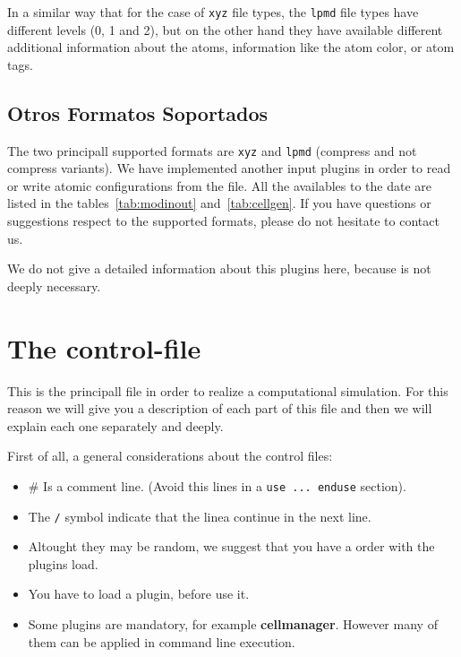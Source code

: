 In a similar way that for the case of \verb|xyz| file types, the \verb|lpmd|
file types have different levels (0, 1 and 2), but on the other hand they have
available different additional information about the atoms, information like
the atom color, or atom tags.

\subsection{Otros Formatos Soportados}

The two principall supported formats are \verb|xyz| and \verb|lpmd| (compress
and not compress variants). We have implemented another input plugins in order
to read or write atomic configurations from the file. All the availables to the
date are listed in the tables~\ref{tab:modinout} and~\ref{tab:cellgen}. If you
have questions or suggestions respect to the supported formats, please do not
hesitate to contact us.

We do not give a detailed information about this plugins here, because is not
deeply necessary.

\section{The control-file}


This is the principall file in order to realize a computational simulation. For
this reason we will give you a description of each part of this file and then
we will explain each one separately and deeply.

First of all, a general considerations about the control files:

\begin{itemize}
 \item \# Is a comment line. (Avoid this lines in a \texttt{use ... enduse}
section).
 \item The \verb|/| symbol indicate that the linea continue in the next line.
 \item Altought they may be random, we suggest that you have a order with
the plugins load.
 \item You have to load a plugin, before use it.
 \item Some plugins are mandatory, for example \textbf{cellmanager}.
However many of them can be applied in command line execution.
\end{itemize}

